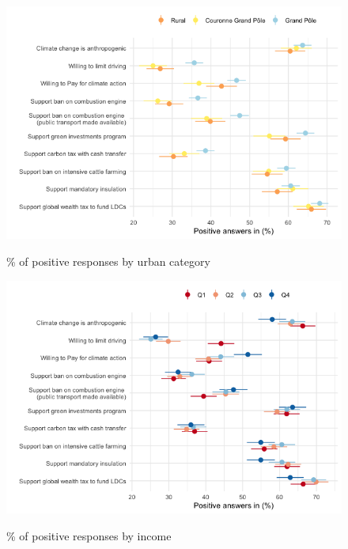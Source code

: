 \begin{framefont}{\small}
\begin{frame}{}%
\begin{figure}[h!]
\caption{\% of positive responses by urban category}
\includegraphics[width=.7\paperwidth]{../figures/FR/positive_all_by_urban_FR.png} \\
\end{figure}
\end{frame}

\begin{frame}{}%
\begin{figure}[h!]
\caption{\% of positive responses by income}
\includegraphics[width=.7\paperwidth]{../figures/FR/positive_all_by_income_FR.png} \\
\end{figure}
\end{frame}


\end{framefont}
